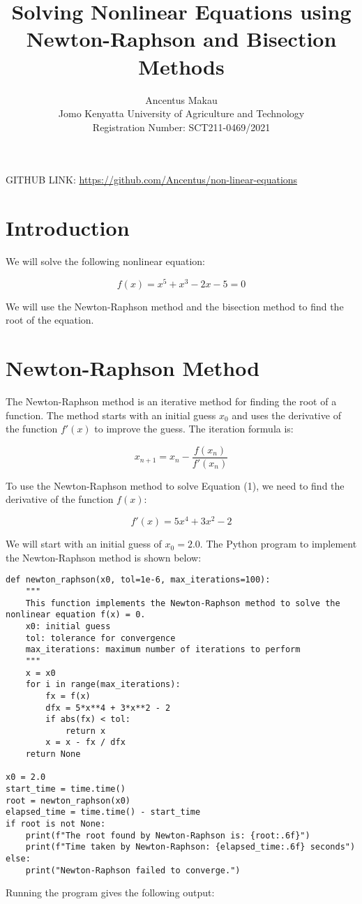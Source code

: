 \documentclass{article}
\title{Solving Nonlinear Equations using Newton-Raphson and Bisection Methods}
\author{Ancentus Makau \\ Jomo Kenyatta University of Agriculture and Technology \\ Registration Number: SCT211-0469/2021}
\date{}
\begin{document}
\maketitle

GITHUB LINK: \url{https://github.com/Ancentus/non-linear-equations}

\section{Introduction}

We will solve the following nonlinear equation:

\begin{equation}
    f(x) = x^5 + x^3 - 2x - 5 = 0
\end{equation}

We will use the Newton-Raphson method and the bisection method to find the root of the equation.

\section{Newton-Raphson Method}

The Newton-Raphson method is an iterative method for finding the root of a function. The method starts with an initial guess $x_0$ and uses the derivative of the function $f'(x)$ to improve the guess. The iteration formula is:

\begin{equation}
    x_{n+1} = x_n - \frac{f(x_n)}{f'(x_n)}
\end{equation}

To use the Newton-Raphson method to solve Equation (1), we need to find the derivative of the function $f(x)$:

\begin{equation}
    f'(x) = 5x^4 + 3x^2 - 2
\end{equation}

We will start with an initial guess of $x_0 = 2.0$.
The Python program to implement the Newton-Raphson method is shown below:

\begin{lstlisting}
def newton_raphson(x0, tol=1e-6, max_iterations=100):
    """
    This function implements the Newton-Raphson method to solve the nonlinear equation f(x) = 0.
    x0: initial guess
    tol: tolerance for convergence
    max_iterations: maximum number of iterations to perform
    """
    x = x0
    for i in range(max_iterations):
        fx = f(x)
        dfx = 5*x**4 + 3*x**2 - 2
        if abs(fx) < tol:
            return x
        x = x - fx / dfx
    return None

x0 = 2.0
start_time = time.time()
root = newton_raphson(x0)
elapsed_time = time.time() - start_time
if root is not None:
    print(f"The root found by Newton-Raphson is: {root:.6f}")
    print(f"Time taken by Newton-Raphson: {elapsed_time:.6f} seconds")
else:
    print("Newton-Raphson failed to converge.")

\end{lstlisting}
Running the program gives the following output:
\end{document}
